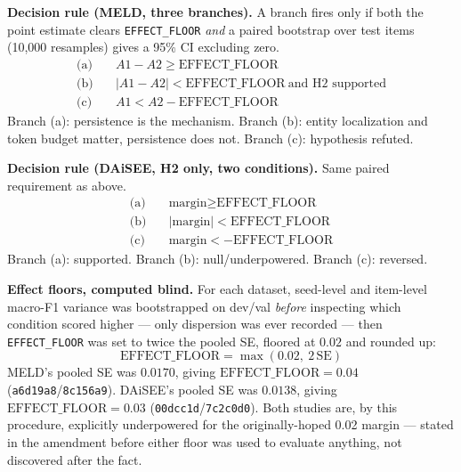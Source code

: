 \textbf{Decision rule (MELD, three branches).} A branch fires only if both
the point estimate clears \texttt{EFFECT\_FLOOR} \emph{and} a paired
bootstrap over test items (10{,}000 resamples) gives a 95\% CI excluding
zero.
\begin{align*}
\text{(a)}&\quad A1 - A2 \geq \text{EFFECT\_FLOOR} \\
\text{(b)}&\quad |A1{-}A2| < \text{EFFECT\_FLOOR} \ \text{and H2 supported} \\
\text{(c)}&\quad A1 < A2 - \text{EFFECT\_FLOOR}
\end{align*}
Branch (a): persistence is the mechanism. Branch (b): entity localization
and token budget matter, persistence does not. Branch (c): hypothesis
refuted.

\textbf{Decision rule (DAiSEE, H2 only, two conditions).} Same paired
requirement as above.
\begin{align*}
\text{(a)}&\quad \text{margin} \geq \text{EFFECT\_FLOOR} \\
\text{(b)}&\quad |\text{margin}| < \text{EFFECT\_FLOOR} \\
\text{(c)}&\quad \text{margin} < -\text{EFFECT\_FLOOR}
\end{align*}
Branch (a): supported. Branch (b): null/underpowered. Branch (c): reversed.

\textbf{Effect floors, computed blind.} For each dataset, seed-level and
item-level macro-F1 variance was bootstrapped on dev/val \emph{before}
inspecting which condition scored higher --- only dispersion was ever
recorded --- then \texttt{EFFECT\_FLOOR} was set to twice the pooled SE,
floored at $0.02$ and rounded up:
\[
\text{EFFECT\_FLOOR} = \max(0.02,\ 2\,\text{SE})
\]
MELD's pooled SE was $0.0170$, giving $\text{EFFECT\_FLOOR}=0.04$
(\texttt{a6d19a8}/\texttt{8c156a9}). DAiSEE's pooled SE was $0.0138$, giving
$\text{EFFECT\_FLOOR}=0.03$
(\texttt{00dcc1d}/\texttt{7c2c0d0}). Both studies are, by this procedure,
explicitly underpowered for the originally-hoped 0.02 margin --- stated in
the amendment before either floor was used to evaluate anything, not
discovered after the fact.

